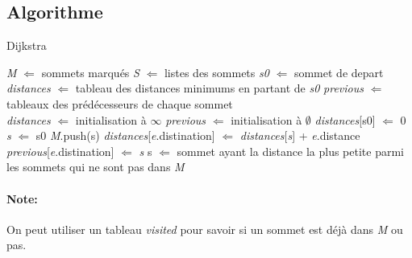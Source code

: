 \documentclass[11pt]{extarticle}
\begin{document}
\subsection{Algorithme}
\begin{algorithm}
\caption{Dijkstra}\label{dijkstra}
\begin{algorithmic}
    \State \textit{M} $\Leftarrow$ sommets marqués
    \State \textit{S} $\Leftarrow$ listes des sommets
    \State \textit{s0} $\Leftarrow$ sommet de depart
    \State \textit{distances} $\Leftarrow$ tableau des distances minimums en partant de \textit{s0}
    \State \textit{previous} $\Leftarrow$ tableaux des prédécesseurs de chaque sommet
    \\
	\State \textit{distances} $\Leftarrow$ initialisation à $\infty$
	\State \textit{previous} $\Leftarrow$ initialisation à $\emptyset$
	\State \textit{distances}[s0] $\Leftarrow$ 0
	\State \textit{s} $\Leftarrow$ s0
    	\State \textit{M}.push(s)
    			\State \textit{distances}[\textit{e}.distination] $\Leftarrow$ \textit{distances}[\textit{s}] + \textit{e}.distance
    			\State \textit{previous}[\textit{e}.distination] $\Leftarrow$ \textit{s}
    		\EndIf
    	\EndFor
    	\State s $\Leftarrow$ sommet ayant la distance la plus petite parmi les sommets qui ne sont pas dans \textit{M}
    \EndWhile
\end{algorithmic}
\end{algorithm}
\paragraph{\textbf{Note:}} On peut utiliser un tableau \textit{visited} pour savoir si un sommet est déjà dans \textit{M} ou pas.
\newpage
\end{document}
